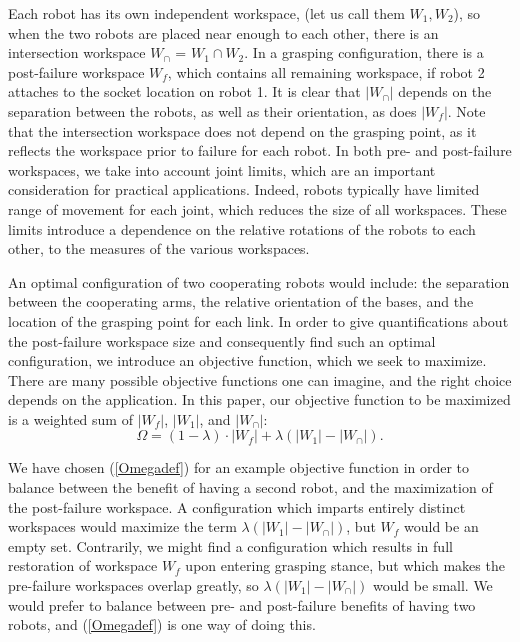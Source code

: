 \documentclass[12pt]{report}
\begin{document}
Each robot has its own independent workspace, (let us call them $W_1, W_2$), so  when the two robots are placed near enough to each other, there is an intersection workspace $W_\cap$ = $W_1 \cap W_2$.  In a grasping configuration, there is a post-failure workspace $W_f$, which contains all remaining workspace, if robot 2 attaches to the socket location on robot 1.  It is clear that $|W_\cap|$ depends on the separation between the robots, as well as their orientation, as does $|W_f|$.  Note that the intersection workspace does not depend on the grasping point, as it reflects the workspace prior to failure for each robot. In  both pre- and post-failure workspaces, we take into account joint limits, which are an important consideration for practical applications. Indeed, 
robots typically have limited range of movement for each joint, which reduces the size of all workspaces.  These limits introduce a dependence on the relative rotations of the robots to each other, to the measures of the various workspaces.

An optimal configuration of two cooperating robots would include: the separation between the cooperating arms, the relative orientation of the bases, and the location of the grasping point for each link.  In order to give quantifications about the post-failure workspace size and consequently find such an optimal configuration, we introduce an objective function, which we seek to maximize.  There are many possible objective functions one can imagine, and the right choice depends on the application. In this paper, our
objective function to be maximized is a weighted sum of $|W_f|$, $|W_1|$, and $|W_\cap|$:
\begin{equation}
\Omega = (1 - \lambda) \cdot |W_f| + \lambda(|W_1|  - |W_\cap|).
\label{Omegadef}
\end{equation} 

We have chosen (\ref{Omegadef}) for an example objective function in order to balance between the benefit of having a second robot, and the maximization of the post-failure workspace.  A configuration which imparts entirely distinct workspaces would maximize the term $\lambda(|W_1|  - |W_\cap|)$, but $W_f$ would be an empty set.  Contrarily, we might find a configuration which results in full restoration of workspace $W_f$ upon entering grasping stance, but which makes the pre-failure workspaces overlap greatly, so $ \lambda(|W_1|  - |W_\cap|)$ would be small.  We would prefer to balance between pre- and post-failure benefits of having two robots, and (\ref{Omegadef}) is one way of doing this.
\end{document}
